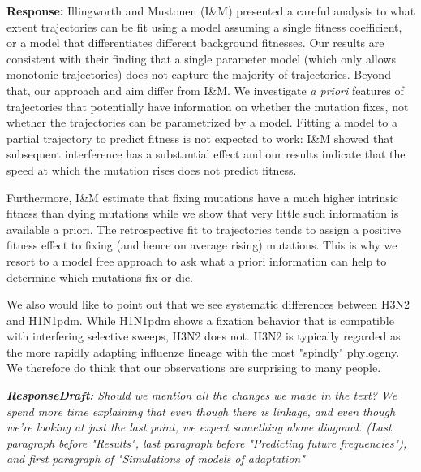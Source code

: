 \documentclass[aps,rmp,onecolumn]{revtex4-1}
\newcommand{\response}[1]{{\it {\color{response}\textbf{Response:} #1}}\vskip 5mm}
\newcommand{\responsedraft}[1]{{\it {\color{purple}\textbf{ResponseDraft:} #1}}\vskip 5mm}
\begin{document}
\response{
	Illingworth and Mustonen (I\&M) presented a careful analysis to what extent trajectories can be fit using a model assuming a single fitness coefficient, or a model that differentiates different background fitnesses.
	Our results are consistent with their finding that a single parameter model (which only allows monotonic trajectories) does not capture the majority of trajectories.
	Beyond that, our approach and aim differ from I\&M.
	We investigate \emph{a priori} features of trajectories that potentially have information on whether the mutation fixes, not whether the trajectories can be parametrized by a model.
	Fitting a model to a partial trajectory to predict fitness is not expected to work: I\&M showed that subsequent interference has a substantial effect and our results indicate that the speed at which the mutation rises does not predict fitness.

	Furthermore, I\&M estimate that fixing mutations have a much higher intrinsic fitness than dying mutations while we show that very little such information is available a priori.
	The retrospective fit to trajectories tends to assign a positive fitness effect to fixing (and hence on average rising) mutations.
	This is why we resort to a model free approach to ask what a priori information can help to determine which mutations fix or die.

    We also would like to point out that we see systematic differences between H3N2 and H1N1pdm.
    While H1N1pdm shows a fixation behavior that is compatible with interfering selective sweeps, H3N2 does not.
    H3N2 is typically regarded as the more rapidly adapting influenze lineage with the most "spindly" phylogeny.
    We therefore do think that our observations are surprising to many people.
}
\responsedraft{Should we mention all the changes we made in the text?
We spend more time explaining that even though there is linkage, and even though we're looking at just the last point, we expect something above diagonal.
(Last paragraph before "Results", last paragraph before "Predicting future frequencies"), and first paragraph of "Simulations of models of adaptation"}
\end{document}
